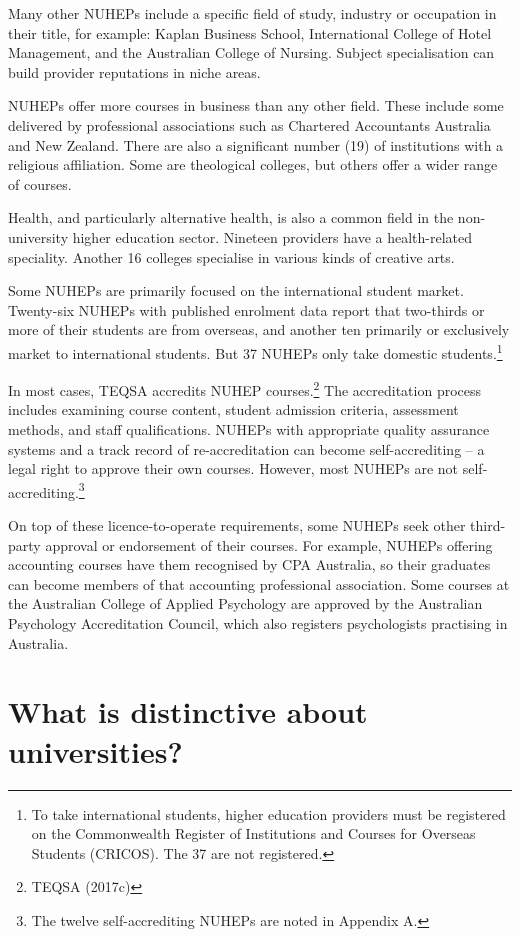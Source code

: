 \documentclass[]{book}
\begin{document}
Many other NUHEPs include a specific field of study, industry or occupation in their title, for example: Kaplan Business School, International College of Hotel Management, and the Australian College of Nursing. Subject specialisation can build provider reputations in niche areas.

NUHEPs offer more courses in business than any other field. These include some delivered by professional associations such as Chartered Accountants Australia and New Zealand. There are also a significant number (19) of institutions with a religious affiliation. Some are theological colleges, but others offer a wider range of courses.

Health, and particularly alternative health, is also a common field in the non-university higher education sector. Nineteen providers have a health-related speciality. Another 16 colleges specialise in various kinds of creative arts.

Some NUHEPs are primarily focused on the international student market. Twenty-six NUHEPs with published enrolment data report that two-thirds or more of their students are from overseas, and another ten primarily or exclusively market to international students. But 37 NUHEPs only take domestic students.\footnote{To take international students, higher education providers must be registered on the Commonwealth Register of Institutions and Courses for Overseas Students (CRICOS). The 37 are not registered.}

In most cases, TEQSA accredits NUHEP courses.\footnote{TEQSA (2017c)} The accreditation process includes examining course content, student admission criteria, assessment methods, and staff qualifications. NUHEPs with appropriate quality assurance systems and a track record of re-accreditation can become self-accrediting -- a legal right to approve their own courses. However, most NUHEPs are not self-accrediting.\footnote{The twelve self-accrediting NUHEPs are noted in Appendix A.}

On top of these licence-to-operate requirements, some NUHEPs seek other third-party approval or endorsement of their courses. For example, NUHEPs offering accounting courses have them recognised by CPA Australia, so their graduates can become members of that accounting professional association. Some courses at the Australian College of Applied Psychology are approved by the Australian Psychology Accreditation Council, which also registers psychologists practising in Australia.

\hypertarget{what-is-distinctive-about-universities}{%
\section{What is distinctive about universities?}\label{what-is-distinctive-about-universities}}
\end{document}
